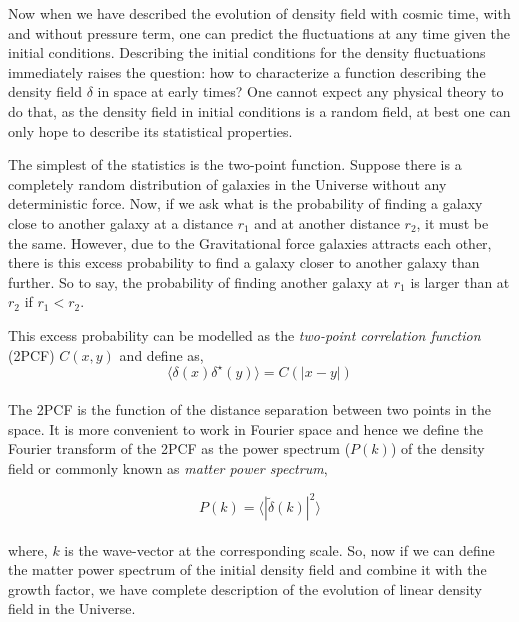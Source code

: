 Now when we have described the evolution of density field with cosmic time, with and
without pressure term, one can predict the fluctuations at any time given the initial
conditions. Describing the initial conditions for the density fluctuations immediately
raises the question: how to characterize a function describing the density field $\delta$
in space at early times? One cannot expect any physical theory to do that, as the density field
in initial conditions is a random field, at best one can only hope to describe its
statistical properties. 

The simplest of the statistics is the two-point function. Suppose there is a 
completely random distribution of galaxies in the Universe without any deterministic 
force. Now, if we ask what is the probability of finding a galaxy close to another
galaxy at a distance $r_1$ and at another distance $r_2$, it must be the same. 
However, due to the Gravitational force galaxies attracts each other, 
there is this excess probability to find a galaxy closer to another galaxy than
further. So to say, the probability of finding another galaxy at $r_1$ is larger than
at $r_2$ if $r_1<r_2$.

This excess probability can be modelled as the {\it two-point correlation function} (2PCF) 
$C(x,y)$ and define as, 
\begin{equation}
	\langle \delta(x) \delta^{\star}(y) \rangle = C(|x-y|)
\end{equation}
\\
The 2PCF is the function of the distance
separation between two points in the space. It is more convenient to work in 
Fourier space and hence we define the Fourier transform of the 2PCF as the 
power spectrum ($P(k)$) of the density field or commonly known as
{\it matter power spectrum},

\begin{equation}
		P(k)  =  \langle |\tilde{\delta}(k) |^2\rangle 
		\label{eqn:pkk}
\end{equation}
\\
where, $k$ is the wave-vector at the corresponding scale. So, now if we can 
define the matter power spectrum of the initial density field and combine
it with the growth factor, we have complete description of the evolution 
of linear density field in the Universe. 

